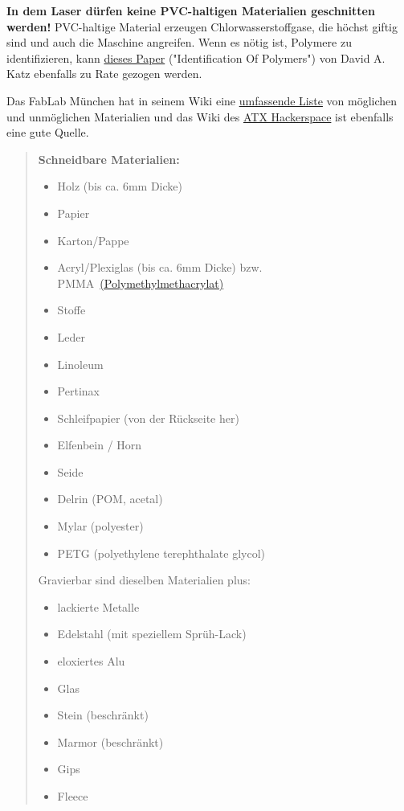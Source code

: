 \documentclass[]{article}
\providecommand{\tightlist}{%
  \setlength{\itemsep}{0pt}\setlength{\parskip}{0pt}}
\begin{document}
\textbf{In dem Laser dürfen keine PVC-haltigen Materialien geschnitten
werden!} PVC-haltige Material erzeugen Chlorwasserstoffgase, die höchst
giftig sind und auch die Maschine angreifen. Wenn es nötig ist, Polymere
zu identifizieren, kann
\href{http://www.chymist.com/Polymer\%20Identification.pdf}{dieses
Paper} ("Identification Of Polymers") von David A. Katz ebenfalls zu
Rate gezogen werden.

Das FabLab München hat in seinem Wiki eine
\href{http://wiki.fablab-muenchen.de/pages/viewpage.action?pageId=1179992}{umfassende
Liste} von möglichen und unmöglichen Materialien und das Wiki des
\href{http://atxhackerspace.org/wiki/Laser_Cutter_Materials}{ATX
Hackerspace} ist ebenfalls eine gute Quelle.

\begin{quote}
\textbf{Schneidbare Materialien:}

\begin{itemize}
\tightlist
\item
  Holz (bis ca. 6mm Dicke)
\item
  Papier
\item
  Karton/Pappe
\item
  Acryl/Plexiglas (bis ca. 6mm Dicke) bzw.
  PMMA~\href{https://de.wikipedia.org/wiki/Polymethylmethacrylat}{(Polymethylmethacrylat)}
\item
  Stoffe
\item
  Leder
\item
  Linoleum
\item
  Pertinax
\item
  Schleifpapier (von der Rückseite her)
\item
  Elfenbein / Horn
\item
  Seide
\item
  Delrin (POM, acetal)
\item
  Mylar (polyester)
\item
  PETG (polyethylene terephthalate glycol)
\end{itemize}

Gravierbar sind dieselben Materialien plus:

\begin{itemize}
\tightlist
\item
  lackierte Metalle
\item
  Edelstahl (mit speziellem Sprüh-Lack)
\item
  eloxiertes Alu
\item
  Glas
\item
  Stein (beschränkt)
\item
  Marmor (beschränkt)
\item
  Gips
\item
  Fleece
\end{itemize}


\end{quote}
\end{document}
